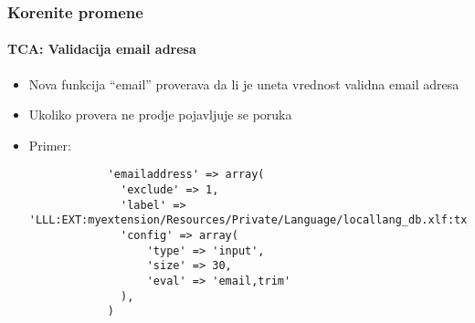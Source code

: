 \begin{frame}[fragile]
	\frametitle{Korenite promene}
	\framesubtitle{TCA: Validacija email adresa}

	\lstset{
		basicstyle=\tiny\ttfamily
	}

	\begin{itemize}

		\item Nova funkcija “email” proverava da li je uneta vrednost validna email adresa
		\item Ukoliko provera ne prodje pojavljuje se poruka
		\item Primer:

		\begin{lstlisting}
			'emailaddress' => array(
			  'exclude' => 1,
			  'label' => 'LLL:EXT:myextension/Resources/Private/Language/locallang_db.xlf:tx_myextension
		 	  'config' => array(
			      'type' => 'input',
			      'size' => 30,
			      'eval' => 'email,trim'
			  ),
			)
		\end{lstlisting}

	\end{itemize}

\end{frame}


